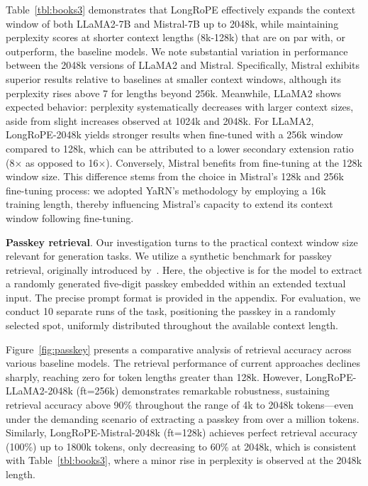 Table~\ref{tbl:books3} demonstrates that LongRoPE effectively expands the context window of both LLaMA2-7B and Mistral-7B up to 2048k, while maintaining perplexity scores at shorter context lengths (8k-128k) that are on par with, or outperform, the baseline models. We note substantial variation in performance between the 2048k versions of LLaMA2 and Mistral. Specifically, Mistral exhibits superior results relative to baselines at smaller context windows, although its perplexity rises above 7 for lengths beyond 256k. Meanwhile, LLaMA2 shows expected behavior: perplexity systematically decreases with larger context sizes, aside from slight increases observed at 1024k and 2048k. For LLaMA2, LongRoPE-2048k yields stronger results when fine-tuned with a 256k window compared to 128k, which can be attributed to a lower secondary extension ratio (8$\times$ as opposed to 16$\times$). Conversely, Mistral benefits from fine-tuning at the 128k window size. This difference stems from the choice in Mistral’s 128k and 256k fine-tuning process: we adopted YaRN's methodology by employing a 16k training length, thereby influencing Mistral’s capacity to extend its context window following fine-tuning.

\textbf{Passkey retrieval}. Our investigation turns to the practical context window size relevant for generation tasks. We utilize a synthetic benchmark for passkey retrieval, originally introduced by~\cite{passkey}. Here, the objective is for the model to extract a randomly generated five-digit passkey embedded within an extended textual input. The precise prompt format is provided in the appendix. For evaluation, we conduct 10 separate runs of the task, positioning the passkey in a randomly selected spot, uniformly distributed throughout the available context length.

Figure~\ref{fig:passkey} presents a comparative analysis of retrieval accuracy across various baseline models. The retrieval performance of current approaches declines sharply, reaching zero for token lengths greater than 128k. However, LongRoPE-LLaMA2-2048k (ft=256k) demonstrates remarkable robustness, sustaining retrieval accuracy above 90\% throughout the range of 4k to 2048k tokens—even under the demanding scenario of extracting a passkey from over a million tokens. Similarly, LongRoPE-Mistral-2048k (ft=128k) achieves perfect retrieval accuracy (100\%) up to 1800k tokens, only decreasing to 60\% at 2048k, which is consistent with Table~\ref{tbl:books3}, where a minor rise in perplexity is observed at the 2048k length.

